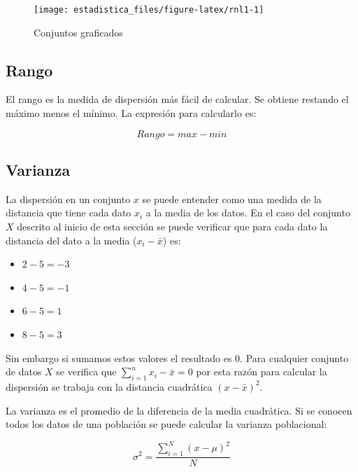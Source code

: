 \documentclass[]{book}
\providecommand{\tightlist}{%
  \setlength{\itemsep}{0pt}\setlength{\parskip}{0pt}}
\begin{document}
\begin{figure}[h]

{\centering \texttt{[image: estadistica\_files/figure-latex/rnl1-1]} 

}

\caption{Conjuntos graficados}\label{fig:rnl1}
\end{figure}

\hypertarget{rango}{%
\subsection{Rango}\label{rango}}

El rango es la medida de dispersión más fácil de calcular. Se obtiene restando el máximo menos el mínimo. La expresión para calcularlo es:

\begin{equation} 
  Rango = max - min
  \label{eq:rg}
\end{equation}

\hypertarget{varianza}{%
\subsection{Varianza}\label{varianza}}

La dispersión en un conjunto \(x\) se puede entender como una medida de la distancia que tiene cada dato \(x_i\) a la media de los datos. En el caso del conjunto \(X\) descrito al inicio de esta sección se puede verificar que para cada dato la distancia del dato a la media (\(x_i-\bar{x}\)) es:

\begin{itemize}
\tightlist
\item
  \(2-5=-3\)
\item
  \(4-5=-1\)
\item
  \(6-5=1\)
\item
  \(8-5=3\)
\end{itemize}

Sin embargo si sumamos estos valores el resultado es \(0\). Para cualquier conjunto de datos \(X\) se verifica que \(\sum_{i=1}^n{x_i-\bar{x}}=0\) por esta razón para calcular la dispersión se trabaja con la distancia cuadrática \(\left(x-\bar{x}\right)^2\).

La varianza es el promedio de la diferencia de la media cuadrática. Si se conocen todos los datos de una población se puede calcular la varianza poblacional:

\begin{equation} 
  \sigma^2 = \dfrac{\sum_{i=1}^{N}\left(x- \mu \right)^2}{N}
  \label{eq:varp}
\end{equation}
\end{document}
